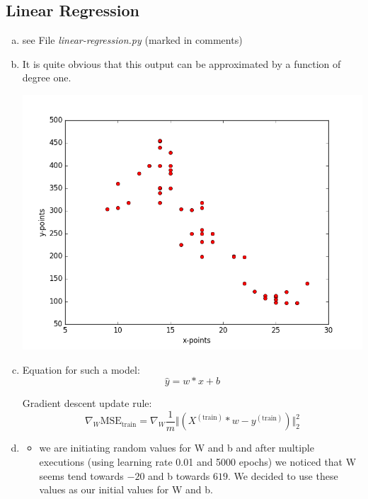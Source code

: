 \documentclass[12pt]{article}
\begin{document}

\setcounter{section}{3}

\subsection{Linear Regression}
\begin{enumerate}[a)]

    \item 
        see File \textit{linear-regression.py} (marked in comments)

    \item 
        It is quite obvious that this output can be approximated by a function of degree one.\\
        \begin{center}
            \includegraphics[scale = 0.52]{pictures/train_distr}\\
        \end{center}

    \item 
        Equation for such a model:
        $$ \hat{y} = w*x + b $$

        Gradient descent update rule:
        $$ \nabla_W \text{MSE}_\text{train} = \nabla_W \frac{1}{m} \Vert (X^{(\text{train})} * w - y^{(\text{train})}) \Vert^2_2 $$

    \item 
        \begin{itemize}
            \item 
                we are initiating random values for W and b and after multiple executions (using learning rate 0.01 and 5000 epochs) we noticed that W seems tend towards $-20$ and b towards $619$. We decided to use these values as our initial values for W and b.


\end{itemize}
\end{enumerate}
\end{document}
